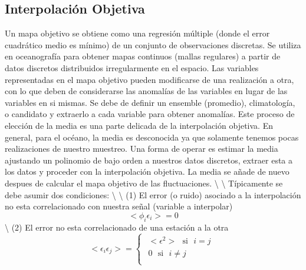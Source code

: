 \documentclass[
]{agujournal2019}
\begin{document}
\subsection{Interpolación Objetiva}

Un mapa objetivo se obtiene como una regresión múltiple (donde el error
cuadrático medio es mínimo) de un conjunto de observaciones discretas.
Se utiliza en oceanografía para obtener mapas continuos (mallas
regulares) a partir de datos discretos distribuidos irregularmente en el
espacio. Las variables representadas en el mapa objetivo pueden
modificarse de una realización a otra, con lo que deben de considerarse
las anomalías de las variables en lugar de las variables en si mismas.
Se debe de definir un ensemble (promedio), climatología, o candidato y
extraerlo a cada variable para obtener anomalías. Este proceso de
elección de la media es una parte delicada de la interpolación objetiva.
En general, para el océano, la media es desconocida ya que solamente
tenemos pocas realizaciones de nuestro muestreo. Una forma de operar es
estimar la media ajustando un polinomio de bajo orden a nuestros datos
discretos, extraer esta a los datos y proceder con la interpolación
objetiva. La media se añade de nuevo despues de calcular el mapa
objetivo de las fluctuaciones. \textbackslash{} \textbackslash{}
Típicamente se debe asumir dos condiciones: \textbackslash{}
\textbackslash{} (1) El error (o ruido) asociado a la interpolación no
esta correlacionado con nuestra señal (variable a interpolar)
\[<\phi_i\epsilon_i>=0\] \textbackslash{} (2) El error no esta
correlacionado de una estación a la otra \[<\epsilon_i \epsilon_j>=
\begin{cases}
\begin{array}{c}
   <\epsilon^2> \,\,\,\,\text{si} \,\,\,\,i=j\\
   0    \,\,\,\,        \text{si} \,\,\,\,i\ne j\\
\end{array}
\end{cases}\]
\end{document}
